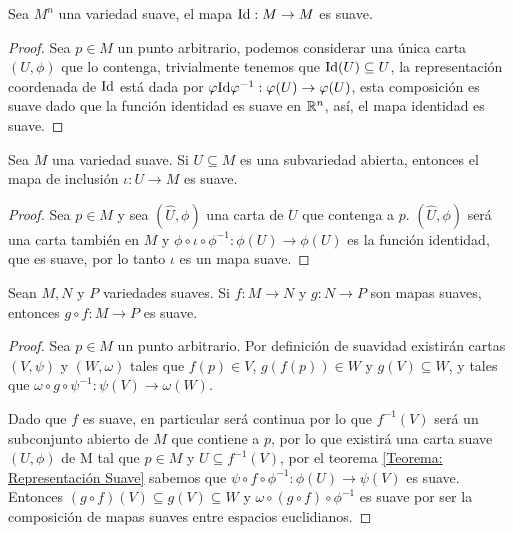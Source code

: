 \begin{theorem}
	Sea $M^n$ una variedad suave, el mapa $\mathrm{Id}: M \to M$ es suave.
\end{theorem}

\begin{proof}
	Sea $p \in M$ un punto arbitrario, podemos considerar una única carta $(U,\phi)$ que lo contenga, trivialmente tenemos que $\mathrm{Id}(U) \subseteq U$, la representación coordenada de $\mathrm{Id}$ está dada por $\varphi \mathrm{Id} \varphi^{-1}: \varphi(U) \to \varphi(U)$, esta composición es suave dado que la función identidad es suave en $\mathbb{R}^n$, así, el mapa identidad es suave.
\end{proof}

\begin{theorem}\label{Teorema: Mapa De Inclusion}
	Sea $M$ una variedad suave. Si $U \subseteq M$ es una subvariedad abierta, entonces el mapa de inclusión $\iota: U \to M$ es suave.
\end{theorem}

\begin{proof}
	Sea $p \in M$ y sea $(\hat{U},\phi)$ una carta de $U$ que contenga a $p$. $(\hat{U},\phi)$ será una carta también en $M$ y $\phi \circ \iota \circ \phi^{-1}: \phi(U) \to \phi(U)$ es la función identidad, que es suave, por lo tanto $\iota$ es un mapa suave.
\end{proof}

\begin{theorem}\label{Teorema: Composición de Mapas Suaves}
	Sean $M,N$ y $P$ variedades suaves. Si $f: M \to N$ y $g: N \to P$ son mapas suaves, entonces $g \circ f: M \to P$ es suave.
\end{theorem}

\begin{proof}
	Sea $p \in M$ un punto arbitrario. Por definición de suavidad existirán cartas $(V,\psi)$ y $(W,\omega)$ tales que $f(p) \in V$, $g(f(p)) \in W$ y $g(V) \subseteq W$, y tales que $\omega \circ g \circ \psi^{-1}: \psi(V) \to \omega(W)$.

	Dado que $f$ es suave, en particular será continua por lo que $f^{-1}(V)$ será un subconjunto abierto de $M$ que contiene a $p$, por lo que existirá una carta suave $(U,\phi)$ de M tal que $p \in M$ y $U \subseteq f^{-1}(V)$, por el teorema \ref{Teorema: Representación Suave} sabemos que $\psi \circ f \circ \phi^{-1}: \phi(U) \to \psi(V)$ es suave. Entonces $(g \circ f)(V) \subseteq g(V) \subseteq W$ y $\omega \circ (g \circ f) \circ \phi^{-1}$ es suave por ser la composición de mapas suaves entre espacios euclidianos.
\end{proof}

